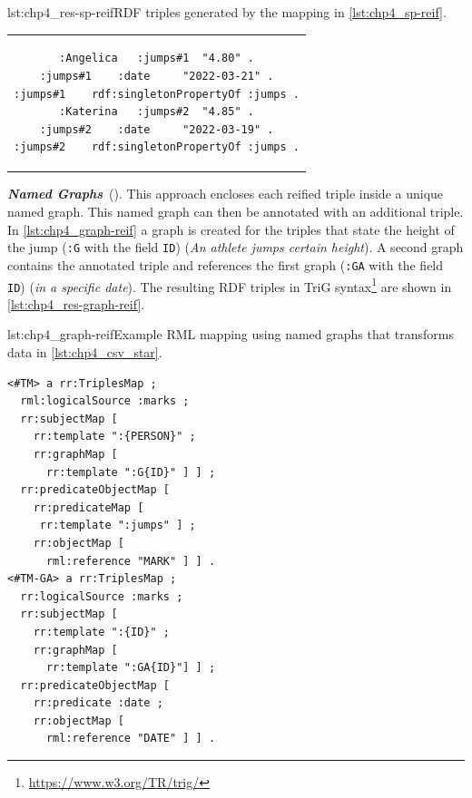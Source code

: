 \noindent\hspace{0.12\linewidth}\begin{minipage}{\linewidth}
\begin{captionedlisting}{lst:chp4_res-sp-reif}{RDF triples generated by the mapping in \cref{lst:chp4_sp-reif}.}
\centering
\begin{tabular}{c}
\hspace{4em}
{\begin{lstlisting}[basicstyle=\ttfamily\small,label={list:example1},columns=flexible]
:Angelica   :jumps#1  "4.80" .
:jumps#1    :date     "2022-03-21" .
:jumps#1    rdf:singletonPropertyOf :jumps .
:Katerina   :jumps#2  "4.85" .
:jumps#2    :date     "2022-03-19" .
:jumps#2    rdf:singletonPropertyOf :jumps .
\end{lstlisting}}
\end{tabular}
\end{captionedlisting}
\end{minipage}



\textit{\textbf{Named Graphs}}~(\cite{carroll2005namedgraphs}). This approach encloses each reified triple inside a unique named graph. This named graph can then be annotated with an additional triple. In \cref{lst:chp4_graph-reif} a graph is created for the triples that state the height of the jump (\texttt{:G} with the field \texttt{ID}) (\textit{An athlete jumps certain height}). A second graph contains the annotated triple and references the first graph (\texttt{:GA} with the field \texttt{ID}) (\textit{in a specific date}). The resulting RDF triples in TriG syntax\footnote{\url{https://www.w3.org/TR/trig/}} are shown in \cref{lst:chp4_res-graph-reif}.

\begin{minipage}{\linewidth}
\begin{captionedlisting}{lst:chp4_graph-reif}{Example RML mapping using named graphs that transforms data in \cref{lst:chp4_csv_star}.}
\centering
\begin{multicols}{2}
{\begin{lstlisting}[basicstyle=\ttfamily\small,label={list:example1},columns=flexible]
<#TM> a rr:TriplesMap ;
  rml:logicalSource :marks ;
  rr:subjectMap [ 
    rr:template ":{PERSON}" ;
    rr:graphMap [
      rr:template ":G{ID}" ] ] ;
  rr:predicateObjectMap [ 
    rr:predicateMap [
     rr:template ":jumps" ] ;
    rr:objectMap [
      rml:reference "MARK" ] ] .
<#TM-GA> a rr:TriplesMap ;
  rr:logicalSource :marks ;
  rr:subjectMap [ 
    rr:template ":{ID}" ;
    rr:graphMap [
      rr:template ":GA{ID}"] ] ;
  rr:predicateObjectMap [ 
    rr:predicate :date ;
    rr:objectMap [
      rml:reference "DATE" ] ] .
\end{lstlisting}}
\end{multicols}
\end{captionedlisting}
\end{minipage}


